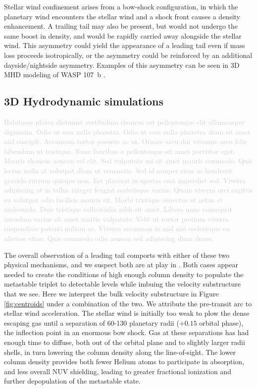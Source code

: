 \documentclass[twocolumn]{aastex631}
\newcommand{\hatpb}{\object{HAT-P-67 b}}
\begin{document}
Stellar wind confinement \citep{2022ApJ...926..226M} arises from a bow-shock configuration, in which the planetary wind encounters the stellar wind and a shock front causes a density enhancement.  A trailing tail may also be present, but would not undergo the same boost in density, and would be rapidly carried away alongside the stellar wind.  This asymmetry could yield the appearance of a leading tail even if mass loss proceeds isotropically, or the asymmetry could be reinforced by an additional dayside/nightside asymmetry.  Examples of this asymmetry can be seen in 3D MHD modeling of WASP 107~b \citep{2022ApJ...926..226M}.

\subsection{3D Hydrodynamic simulations}\label{sec3Dsimulations}
\textcolor{lightgray}{Habitasse platea dictumst vestibulum rhoncus est pellentesque elit ullamcorper dignissim. Odio ut sem nulla pharetra. Odio ut sem nulla pharetra diam sit amet nisl suscipit. Accumsan tortor posuere ac ut. Ornare arcu dui vivamus arcu felis bibendum ut tristique. Nunc faucibus a pellentesque sit amet porttitor eget. Mauris rhoncus aenean vel elit. Sed vulputate mi sit amet mauris commodo. Quis lectus nulla at volutpat diam ut venenatis. Sed id semper risus in hendrerit gravida rutrum quisque non. Est placerat in egestas erat imperdiet sed. Viverra adipiscing at in tellus integer feugiat scelerisque varius. Quam viverra orci sagittis eu volutpat odio facilisis mauris sit. Morbi tristique senectus et netus et malesuada. Duis tristique sollicitudin nibh sit amet. Libero nunc consequat interdum varius sit amet mattis vulputate. Velit ut tortor pretium viverra suspendisse potenti nullam ac. Viverra accumsan in nisl nisi scelerisque eu ultrices vitae. Quis commodo odio aenean sed adipiscing diam donec.}

The overall observation of a leading tail comports with either of these two physical mechanisms, and we suspect both are at play in \hatpb.  Both cases appear needed to create the conditions of high enough column density to populate the  metastable triplet to detectable levels while imbuing the velocity substructure that we see.  Here we interpret the bulk velocity substructure in Figure \ref{fig:centroids} under a combination of the two.  We attribute the pre-transit arc to stellar wind acceleration.  The stellar wind is initially too weak to plow the dense escaping gas until a separation of 60-130 planetary radii ($+0.15$ orbital phase), the inflection point in an enormous bow shock.  Gas at these separations has had enough time to diffuse, both out of the orbital plane and to slightly larger radii shells, in turn lowering the column density along the line-of-sight.  The lower column density provides both fewer Helium atoms to participate in absorption, and less overall NUV shielding, leading to greater fractional ionization and further depopulation of the  metastable state.
\end{document}
